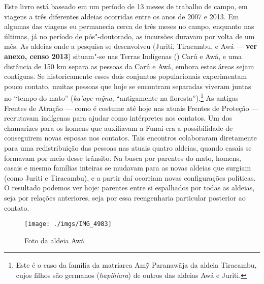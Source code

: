 Este livro está baseado em um período de 13 meses de trabalho de campo,
em viagens a três diferentes aldeias ocorridas entre os anos de 2007 e
2013. Em algumas das viagens eu permanecia cerca de três meses no campo,
enquanto nas últimas, já no período de pós"-doutorado, as incursões
duravam por volta de um mês. As aldeias onde a pesquisa se desenvolveu
(Juriti, Tiracambu, e Awá --- \textbf{ver anexo,
censo 2013})
 situam"-se nas Terras Indígenas () Carú e Awá, e uma
distância de 150 km separa as pessoas da  Carú e Awá, embora estas áreas
sejam contíguas. Se historicamente esses dois conjuntos
populacionais experimentam pouco contato, muitas pessoas que hoje se
encontram separadas viveram juntas no ``tempo do mato'' (\emph{ka'ape
mỹna}, ``antigamente na floresta'').\footnote{Este é o caso da família da
  matriarca Amỹ Paranawãja da aldeia Tiracambu, cujos filhos são
  germanos (\emph{hapihiara}) de outros das aldeias Awá e Juriti.} As
antigas Frentes de Atração --- como é costume até hoje nas atuais Frentes
de Proteção --- recrutavam indígenas para ajudar como intérpretes nos
contatos. Um dos chamarizes para os homens que auxiliavam a Funai era a
possibilidade de conseguirem novas esposas nos contatos. Tais encontros
colaboraram diretamente para uma redistribuição das pessoas nas atuais
quatro aldeias, quando casais se formavam por meio desse trânsito. Na
busca por parentes do mato, homens, casais e mesmo famílias inteiras se
mudavam para as novas aldeias que surgiam (como Juriti e Tiracambu), e a
partir daí ocorriam novas configurações políticas. O resultado podemos
ver hoje: parentes entre si espalhados por todas as aldeias, seja por
relações anteriores, seja por essa reengenharia particular posterior ao
contato.

\begin{figure}[H]
\centering
  \texttt{[image: ./imgs/IMG\_4983]}
\caption{Foto da aldeia Awá}
\end{figure}

